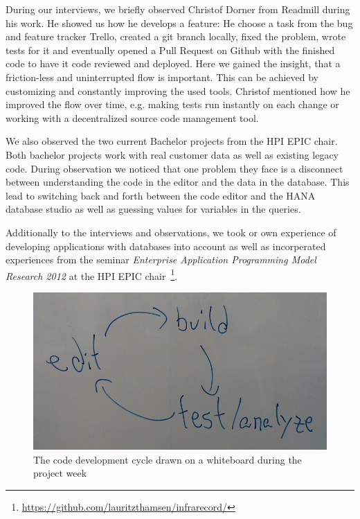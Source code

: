 
During our interviews, we briefly observed Christof Dorner from Readmill during his work. He showed us how he develops a feature: He choose a task from the bug and feature tracker Trello, created a git branch locally, fixed the problem, wrote tests for it and eventually opened a Pull Request on Github with the finished code to have it code reviewed and deployed. Here we gained the insight, that a friction-less and uninterrupted flow is important. This can be achieved by customizing and constantly improving the used tools. Christof mentioned how he improved the flow over time, e.g. making tests run instantly on each change or working with a decentralized source code management tool.

We also observed the two current Bachelor projects from the HPI EPIC chair. Both bachelor projects work with real customer data as well as existing legacy code. During observation we noticed that one problem they face is a disconnect between understanding the code in the editor and the data in the database. This lead to switching back and forth between the code editor and the HANA database studio as well as guessing values for variables in the queries.

Additionally to the interviews and observations, we took or own experience of developing applications with databases into account as well as incorperated experiences from the seminar \emph{Enterprise Application Programming Model Research 2012} at the HPI EPIC chair~\footnote{\url{https://github.com/lauritzthamsen/infrarecord/}}.

\begin{figure}
    \includegraphics[width=\linewidth]{images/EditBuildTest.jpg}
    \caption{The code development cycle drawn on a whiteboard during the project week}
    \label{fig:cycle}
\end{figure}

